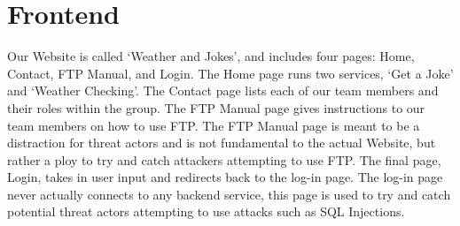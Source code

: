 \section{Frontend}

Our Website is called ‘Weather and Jokes’, and includes four pages: Home, Contact, FTP Manual, and Login. The Home page runs two services, ‘Get a Joke’ and ‘Weather Checking’. The Contact page lists each of our team members and their roles within the group. The FTP Manual page gives instructions to our team members on how to use FTP. The FTP Manual page is meant to be a distraction for threat actors and is not fundamental to the actual Website, but rather a ploy to try and catch attackers attempting to use FTP. The final page, Login, takes in user input and redirects back to the log-in page. The log-in page never actually connects to any backend service, this page is used to try and catch potential threat actors attempting to use attacks such as SQL Injections.
